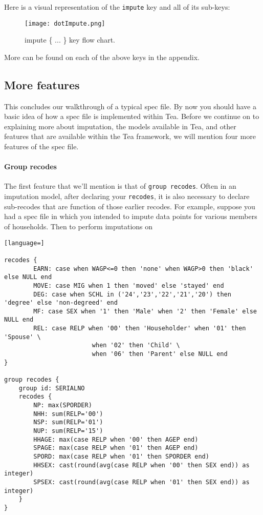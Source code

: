 \documentclass{article}
\begin{document}
Here is a visual representation of the {\tt impute} key and all of its sub-keys:

\begin{figure}[H]
\begin{center}
\texttt{[image: dotImpute.png]}
\caption{impute \{ ... \} key flow chart.}\label{imputefigure}
\end{center}
\end{figure}

More can be found on each of the above keys in the appendix.

\subsection{More features}
This concludes our walkthrough of a typical spec file. By now you should have a basic idea of 
how a spec file is implemented within Tea. Before we continue on to explaining more about imputation, 
the models available in Tea, and other features that are available within the Tea framework, we will mention 
four more features of the spec file.


\paragraph{Group recodes} The first feature that we'll mention is that of {\tt group recodes}. 
Often in an imputation model, after declaring your {\tt recodes}, it is also necessary to declare 
sub-recodes that are function of those earlier recodes. For example, suppose you had a spec file 
in which you intended to impute data points for various members of households. Then to perform imputations 
on 


\begin{lstlisting}[language=]

recodes {
        EARN: case when WAGP<=0 then 'none' when WAGP>0 then 'black' else NULL end
        MOVE: case MIG when 1 then 'moved' else 'stayed' end
        DEG: case when SCHL in ('24','23','22','21','20') then 'degree' else 'non-degreed' end
        MF: case SEX when '1' then 'Male' when '2' then 'Female' else NULL end
        REL: case RELP when '00' then 'Householder' when '01' then 'Spouse' \
                        when '02' then 'Child' \
                        when '06' then 'Parent' else NULL end
}

group recodes {
    group id: SERIALNO
    recodes {
        NP: max(SPORDER)
        NHH: sum(RELP='00')
        NSP: sum(RELP='01')
        NUP: sum(RELP='15')
        HHAGE: max(case RELP when '00' then AGEP end)
        SPAGE: max(case RELP when '01' then AGEP end)
        SPORD: max(case RELP when '01' then SPORDER end)
        HHSEX: cast(round(avg(case RELP when '00' then SEX end)) as integer)
        SPSEX: cast(round(avg(case RELP when '01' then SEX end)) as integer)
    }
}



\end{lstlisting}
\end{document}
